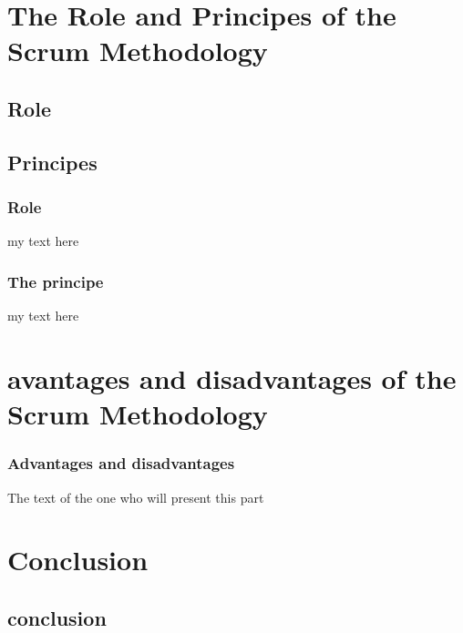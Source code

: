 \documentclass[
	11pt, %
]{beamer}
\begin{document}





\section{The Role and Principes of the Scrum Methodology}
\subsection{Role}
\subsection{Principes}

\begin{frame}
	\frametitle{Role}

	my text here
\end{frame}


\begin{frame}
	\frametitle{The principe}

	my text here
\end{frame}

\section{avantages and disadvantages of the Scrum Methodology}

\begin{frame}
	\frametitle{Advantages and disadvantages}

	The text of the one who will present this part
\end{frame}



\section{Conclusion}
\subsection{conclusion}
\end{document}
